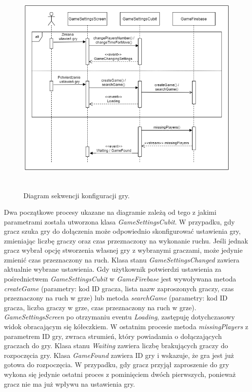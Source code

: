 \begin{figure}[h!]
	\begin{center}
		\includegraphics[width=14cm,height=11cm]{img/diagram-sekwencji-gameSettings.png}
	\end{center}
	\caption{{\color{dgray}Diagram sekwencji konfiguracji gry.}} 
	\label{GameSettingsCubit}
\end{figure} 

Dwa początkowe procesy ukazane na diagramie zależą od tego z jakimi parametrami została utworzona klasa \emph{GameSettingsCubit}. W przypadku, gdy gracz szuka gry do dołączenia może odpowiednio skonfigurować ustawienia gry, zmieniając liczbę graczy oraz czas przeznaczony na  wykonanie ruchu. Jeśli jednak gracz wybrał opcję stworzenia własnej gry z wybranymi graczami, może jedynie zmienić czas przeznaczony na ruch. Klasa stanu \emph{GameSettingsChanged} zawiera aktualnie wybrane ustawienia. Gdy użytkownik potwierdzi ustawienia za pośrednictwem \emph{GameSettingsCubit} w \emph{GameFirebase} jest wywoływana metoda \emph{createGame} (parametry: kod ID gracza, lista nazw zaproszonych graczy, czas przeznaczony na ruch w grze) lub metoda \emph{searchGame} (parametry: kod ID gracza, liczba graczy w grze, czas przeznaczony na ruch w grze). \emph{GameSettingsScreen} po otrzymaniu eventu \emph{Loading}, zastępuję dotychczasowy widok obracającym się kółeczkiem. W ostatnim procesie metoda \emph{missingPlayers} z parametrem ID gry, zwraca strumień, który powiadamia o dołączających graczach do gry. Klasa stanu \emph{Waiting} zawiera liczbę brakujących graczy do rozpoczęcia gry. Klasa \emph{GameFound} zawiera ID gry i wskazuje, że gra jest już gotowa do rozpoczęcia. W przypadku, gdy gracz przyjął zaproszenie do gry wykona się jedynie ostatni proces z pominięciem dwóch pierwszych, ponieważ gracz nie ma już wpływu na ustawienia gry. \\ \\ \\ \\ \\ \\ \\ \\ \\ \\

